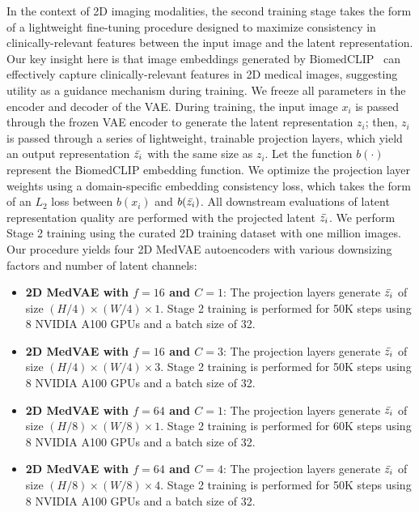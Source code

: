 In the context of 2D imaging modalities, the second training stage takes the form of a lightweight fine-tuning procedure designed to maximize consistency in clinically-relevant features between the input image and the latent representation. Our key insight here is that image embeddings generated by BiomedCLIP~\cite{zhang2023biomedclip} can effectively capture clinically-relevant features in 2D medical images, suggesting utility as a guidance mechanism during training. We freeze all parameters in the encoder and decoder of the VAE. During training, the input image $x_i$ is passed through the frozen VAE encoder to generate the latent representation $z_i$; then, $z_i$ is passed through a series of lightweight, trainable projection layers, which yield an output representation $\Bar{z_i}$ with the same size as $z_i$. Let the function $b(\cdot)$ represent the BiomedCLIP embedding function. We optimize the projection layer weights using a domain-specific embedding consistency loss, which takes the form of an $L_2$ loss between $b(x_i)$ and $b(\Bar{z_i})$. All downstream evaluations of latent representation quality are performed with the projected latent $\Bar{z_i}$. We perform Stage 2 training using the curated 2D training dataset with one million images. Our procedure yields four 2D MedVAE autoencoders with various downsizing factors and number of latent channels:
\begin{itemize}
\item \textbf{2D MedVAE with $f=16$ and $C=1$}: The projection layers generate $\Bar{z_i}$ of size $(H/4) \times (W/4) \times 1$. Stage 2 training is performed for 50K steps using 8 NVIDIA A100 GPUs and a batch size of 32. 
\item \textbf{2D MedVAE with $f=16$ and $C=3$}: The projection layers generate $\Bar{z_i}$ of size $(H/4) \times (W/4) \times 3$. Stage 2 training is performed for 50K steps using 8 NVIDIA A100 GPUs and a batch size of 32. 
\item \textbf{2D MedVAE with $f=64$ and $C=1$}: The projection layers generate $\Bar{z_i}$ of size $(H/8) \times (W/8) \times 1$. Stage 2 training is performed for 60K steps using 8 NVIDIA A100 GPUs and a batch size of 32. 
\item \textbf{2D MedVAE with $f=64$ and $C=4$}: The projection layers generate $\Bar{z_i}$ of size $(H/8) \times (W/8) \times 4$. Stage 2 training is performed for 50K steps using 8 NVIDIA A100 GPUs and a batch size of 32. 
\end{itemize}

